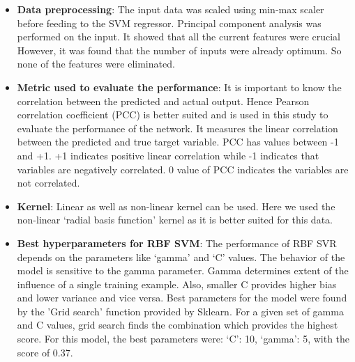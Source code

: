 \documentclass{article}
\begin{document}
\begin{itemize}
\item \textbf{Data preprocessing}: The input data was scaled using min-max scaler before feeding to the SVM regressor. Principal component analysis was performed on the input. It showed that all the current features were crucial However, it was found that the number of inputs were already optimum. So none of the features were eliminated.
\item \textbf{Metric used to evaluate the performance}:  It is important to know the correlation between the predicted and actual output. Hence Pearson correlation coefficient (PCC) is better suited and is used in this study to evaluate the performance of the network. It measures the linear correlation between the predicted and true target variable. PCC has values between -1 and +1. +1 indicates positive linear correlation while -1 indicates that variables are negatively correlated. 0 value of PCC indicates the variables are not correlated.   
\item \textbf{Kernel}:  Linear as well as non-linear kernel can be used. Here we used the non-linear `radial basis function' kernel as it is better suited for this data.  
\item \textbf{Best hyperparameters for RBF SVM}:  The performance of RBF SVR depends on the parameters like `gamma' and `C' values. The behavior of the model is sensitive to the gamma parameter. Gamma determines extent of the influence of a single training example.   Also, smaller C provides higher bias and lower variance and vice versa. Best parameters for the model were found by the 'Grid search' function provided by Sklearn. For a given set of gamma and C values, grid search finds the combination which provides the highest score. For this model, the best parameters were: `C': 10, `gamma': 5, with the score of 0.37.
\end{itemize}
\end{document}
